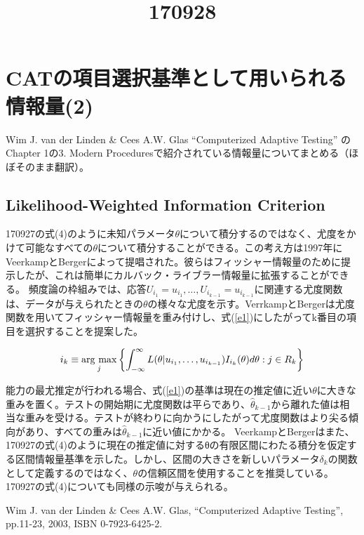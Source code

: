 \documentclass[a4j]{jarticle}
\date{}
\title{170928}
\begin{document}
\maketitle

\section{CATの項目選択基準として用いられる情報量(2)}
Wim J. van der Linden \& Cees A.W. Glas ``Computerized Adaptive Testing'' \cite{b1}のChapter 1の3. Modern Proceduresで紹介されている情報量についてまとめる（ほぼそのまま翻訳）。

\subsection{Likelihood-Weighted Information Criterion}
170927の式(4)のように未知パラメータ$\theta$について積分するのではなく、尤度をかけて可能なすべての$\theta$について積分することができる。この考え方は1997年にVeerkampとBergerによって提唱された。彼らはフィッシャー情報量のために提示したが、これは簡単にカルバック・ライブラー情報量に拡張することができる。
頻度論の枠組みでは、応答$U_{i_{1}}=u_{i_{1}},\ldots,U_{i_{k-1}}=u_{i_{k-1}}$に関連する尤度関数は、データが与えられたときの$\theta$の様々な尤度を示す。VerrkampとBergerは尤度関数を用いてフィッシャー情報量を重み付けし、式(\ref{e1})にしたがってk番目の項目を選択することを提案した。

\newcommand{\argmax}{\mathop{\rm arg~max}\limits}
\begin{eqnarray}
  \label{e1}
  i_{k} \equiv \argmax_{j}\left\{\int_{-\infty}^{\infty}L(\theta|u_{i_{1}},\ldots,u_{i_{k-1}})I_{i_{k}}(\theta)d\theta:j\in R_{k}\right\}
\end{eqnarray}

能力の最尤推定が行われる場合、式(\ref{e1})の基準は現在の推定値に近い$\theta$に大きな重みを置く。テストの開始期に尤度関数は平らであり、$\hat{\theta}_{k-1}$から離れた値は相当な重みを受ける。テストが終わりに向かうにしたがって尤度関数はより尖る傾向があり、すべての重みは$\hat{\theta}_{k-1}$に近い値にかかる。
VeerkampとBergerはまた、170927の式(4)のように現在の推定値に対するθの有限区間にわたる積分を仮定する区間情報量基準を示した。しかし、区間の大きさを新しいパラメータ$\delta_{k}$の関数として定義するのではなく、$\theta$の信頼区間を使用することを推奨している。170927の式(4)についても同様の示唆が与えられる。

\begin{thebibliography}{9}
   Wim J. van der Linden \& Cees A.W. Glas, ``Computerized Adaptive Testing'', pp.11-23, 2003, ISBN 0-7923-6425-2.
\end{thebibliography}
\end{document}
